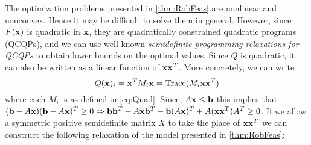 

The optimization problems presented in \cref{thm:RobFeas} are nonlinear and nonconvex.
Hence it may be difficult to solve them in general.
However, since $F(\mathbf{x})$ is quadratic in $\mathbf{x}$, they are quadratically constrained quadratic programs (QCQPs), and we can use well known \emph{semidefinite programming relaxations for QCQPs} 
to obtain lower bounds on the optimal values.\cite{VaBo1996} 
Since $Q$ is quadratic, it can also be written as a linear function of $\mathbf{x}\mathbf{x}^T$.
More concretely, we can write
$$Q(\mathbf{x})_i=\mathbf{x}^TM_i\mathbf{x}=\operatorname{Trace}(M_i\mathbf{x}\mathbf{x}^T)$$
where each $M_i$ is as defined in \cref{eq:Quad}. 
Since, $A\mathbf{x}\leq \mathbf{b}$ this implies that $(\mathbf{b}-A\mathbf{x})(\mathbf{b}-A\mathbf{x})^T\geq 0\Rightarrow \mathbf{b}\mathbf{b}^T-A\mathbf{x}\mathbf{b}^T-\mathbf{b}(A\mathbf{x})^T+A(\mathbf{x}\mathbf{x}^T)A^T\geq 0$. 
If we allow a symmetric positive semidefinite matrix $X$ to take the place of $\mathbf{x}\mathbf{x}^T$ we can construct the following relaxation of the model presented in \cref{thm:RobFeas}:
 
